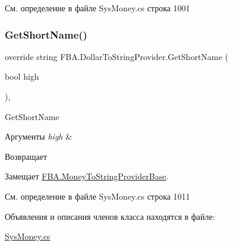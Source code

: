 См. определение в файле Sys\+Money.\+cs строка 1001

\mbox{\label{class_f_b_a_1_1_dollar_to_string_provider_a3da0b133efc7076214481a3c85819cde}} 
\subsubsection{\texorpdfstring{Get\+Short\+Name()}{GetShortName()}}
{\footnotesize\ttfamily override string F\+B\+A.\+Dollar\+To\+String\+Provider.\+Get\+Short\+Name (\begin{DoxyParamCaption}\item[{bool}]{high }\end{DoxyParamCaption})\hspace{0.3cm}{\ttfamily [protected]}, {\ttfamily [virtual]}}



Get\+Short\+Name 


\begin{DoxyParams}{Аргументы}
{\em high} & \\
\hline
\end{DoxyParams}
\begin{DoxyReturn}{Возвращает}

\end{DoxyReturn}


Замещает \mbox{\hyperlink{class_f_b_a_1_1_money_to_string_provider_base_a88f493205be3da3950e2175f1e033595}{F\+B\+A.\+Money\+To\+String\+Provider\+Base}}.



См. определение в файле Sys\+Money.\+cs строка 1011



Объявления и описания членов класса находятся в файле\+:\begin{DoxyCompactItemize}
\item 
\mbox{\hyperlink{_sys_money_8cs}{Sys\+Money.\+cs}}\end{DoxyCompactItemize}
